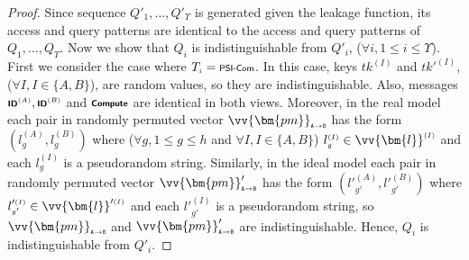 \begin{proof}
Since  sequence $ Q'_{\scriptscriptstyle 1}, ..., Q'_{\scriptscriptstyle \Upsilon}$ is generated given the leakage function, its access and query patterns are identical to the access and query patterns of $Q_{\scriptscriptstyle 1}, ..., Q_{\scriptscriptstyle \Upsilon}$.  Now we show that $Q_{\scriptscriptstyle i}$ is indistinguishable from $Q'_{\scriptscriptstyle i}$, ($\forall i, 1\leq i\leq \Upsilon$). First we consider the  case where $T_{\scriptscriptstyle i}= \textsf {\scriptsize PSI-Com}$. In this case,  keys $tk^{\scriptscriptstyle (I)}$ and $tk'^{\scriptscriptstyle (I)}$, ($\forall I, I\in \{A,B\}$), are random values, so they are indistinguishable. Also,  messages $\textsf {\scriptsize \textbf{ID}}^{\scriptscriptstyle  (A)}, \textsf {\scriptsize \textbf{ID}}^{\scriptscriptstyle  (B)}$ and $\textsf {\scriptsize \textbf{Compute}}$ are identical in both views.  Moreover, in the real model each pair in randomly permuted vector $\vv{\bm{pm}}_{\scriptscriptstyle \mathtt{ A \rightarrow B}}$ has the form $(l^{\scriptscriptstyle  (A)}_{\scriptscriptstyle g},l^{\scriptscriptstyle  (B)}_{\scriptscriptstyle g})$ where ($\forall g, 1\leq g\leq h $ and $\forall I, I \in \{A,B\}$) $l^{\scriptscriptstyle (I)}_{\scriptscriptstyle g} \in \vv{\bm{l}}^{\scriptscriptstyle (I)}$ and each $l^{\scriptscriptstyle (I)}_{\scriptscriptstyle g}$ is a pseudorandom string. Similarly, in the ideal model each pair in randomly permuted vector  $\vv{\bm{pm}}'_{\scriptscriptstyle \mathtt{ A \rightarrow B}}$ has the form $(l'^{\scriptscriptstyle  (A)}_{\scriptscriptstyle g'},l'^{\scriptscriptstyle  (B)}_{\scriptscriptstyle g'})$ where  $l'^{\scriptscriptstyle (I)}_{\scriptscriptstyle g'} \in \vv{\bm{l}}'^{\scriptscriptstyle (I)}$ and each $l'^{\scriptscriptstyle (I)}_{\scriptscriptstyle g'}$ is a pseudorandom string, so   $\vv{\bm{pm}}_{\scriptscriptstyle \mathtt{ A \rightarrow B}}$  and  $\vv{\bm{pm}}'_{\scriptscriptstyle \mathtt{ A \rightarrow B}}$  are indistinguishable.      Hence,  $Q_{\scriptscriptstyle i}$ is indistinguishable from $Q'_{\scriptscriptstyle i}$.



\end{proof}
